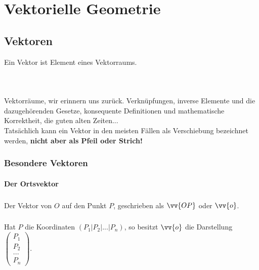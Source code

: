 \chapter{Vektorielle Geometrie}


\section{Vektoren}
    \begin{Definition}
        Ein Vektor ist Element eines Vektorraums.
    \end{Definition}\\
    \paragraph{} Vektorräume, wir erinnern uns zurück. Verknüpfungen, inverse Elemente und die dazugehörenden Gesetze, konsequente Definitionen und mathematische Korrektheit, die guten alten Zeiten...\\
    Tatsächlich kann ein Vektor in den meisten Fällen als Verschiebung bezeichnet werden, \textbf{nicht aber als Pfeil oder Strich!}\\

    \subsection{Besondere Vektoren}

        \subsubsection{Der Ortsvektor}

            \paragraph{} Der Vektor von $O$ auf den Punkt $P$, geschrieben als $\vv{OP}$ oder $\vv{o}$.\\
            \paragraph{} Hat $P$ die Koordinaten $(P_1|P_2|...|P_n)$, so besitzt $\vv{o}$ die Darstellung $\left(\begin{array}{c} P_1 \\ P_2 \\ ...\\P_n\end{array}\right)$.

